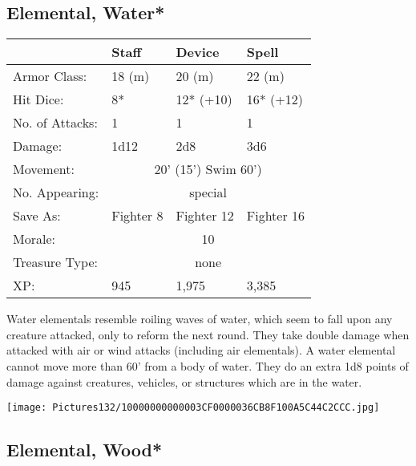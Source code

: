 \documentclass[a4paper,twoside,openany,10pt]{book}
\begin{document}
\begin{multicols}{2}
\subsection*{Elemental, Water*}\label{elemental-water}

\begin{tabularx}{0.48\textwidth}{@{}lllX@{}}
& Staff & Device & Spell \\\hline
Armor Class: & 18 (m) & 20 (m) & 22 (m) \\\hline
Hit Dice: & 8* & 12* (+10) & 16* (+12) \\\hline
No. of Attacks: & 1 & 1 & 1 \\\hline
Damage: & 1d12 & 2d8 & 3d6 \\\hline
Movement:  & \multicolumn{3}{c}{20' (15') Swim 60')}\\\hline
No. Appearing: &\multicolumn{3}{c}{special} \\\hline
Save As: & Fighter 8 & Fighter 12 & Fighter 16 \\\hline
Morale: & \multicolumn{3}{c}{10} \\\hline
Treasure Type: & \multicolumn{3}{c}{none} \\\hline
XP: & 945 & 1,975 & 3,385 \\\hline
\end{tabularx}\medskip

Water elementals resemble roiling waves of water, which seem to fall upon any creature attacked, only to reform the next round. They take double damage when attacked with air or wind attacks (including air elementals). A water elemental cannot move more than 60' from a body of water. They do an extra 1d8 points of damage against creatures, vehicles, or structures which are in the water.


\begin{center}
	\texttt{[image: Pictures132/10000000000003CF0000036CB8F100A5C44C2CCC.jpg]}
\end{center}

\columnbreak

\subsection*{Elemental, Wood*}\label{elemental-wood}


\end{multicols}
\end{document}

